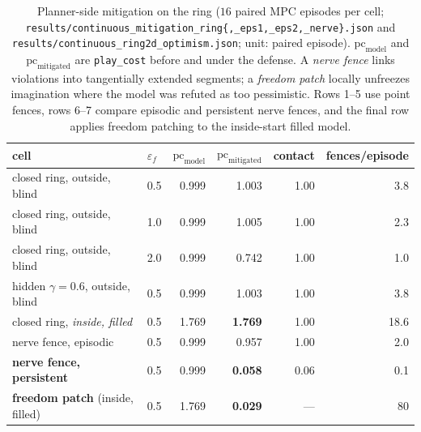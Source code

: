 \documentclass[11pt]{article}
\theoremstyle{remark}
\begin{document}
\begin{table}[h]
\centering
\small
\begin{tabular}{llrrrr}
\toprule
cell & $\varepsilon_f$ & $\mathrm{pc}_{\mathrm{model}}$ &
$\mathrm{pc}_{\mathrm{mitigated}}$ & contact & fences/episode \\
\midrule
closed ring, outside, blind & 0.5 & 0.999 & 1.003 & 1.00 & 3.8 \\
closed ring, outside, blind & 1.0 & 0.999 & 1.005 & 1.00 & 2.3 \\
closed ring, outside, blind & 2.0 & 0.999 & 0.742 & 1.00 & 1.0 \\
hidden $\gamma = 0.6$, outside, blind & 0.5 & 0.999 & 1.003 & 1.00 & 3.8 \\
closed ring, \emph{inside, filled} & 0.5 & 1.769 & \textbf{1.769} & 1.00 & 18.6 \\
\midrule
nerve fence, episodic & 0.5 & 0.999 & 0.957 & 1.00 & 2.0 \\
\textbf{nerve fence, persistent} & 0.5 & 0.999 & \textbf{0.058} & 0.06 & 0.1 \\
\textbf{freedom patch} (inside, filled) & 0.5 & 1.769 & \textbf{0.029} & --- & 80 \\
\bottomrule
\end{tabular}
\caption{Planner-side mitigation on the ring ($16$ paired MPC episodes
per cell;
\texttt{results/continuous\_mitigation\_ring\{,\_eps1,\_eps2,\_nerve\}.json}
and \texttt{results/continuous\_ring2d\_optimism.json}; unit: paired
episode). $\mathrm{pc}_{\mathrm{model}}$ and
$\mathrm{pc}_{\mathrm{mitigated}}$ are \texttt{play\_cost} before and
under the defense. A \emph{nerve fence} links violations into
tangentially extended segments; a \emph{freedom patch} locally
unfreezes imagination where the model was refuted as too pessimistic.
Rows 1--5 use point fences, rows 6--7 compare episodic and persistent
nerve fences, and the final row applies freedom patching to the
inside-start filled model.}
\label{tab:mitigation}
\end{table}
\end{document}
